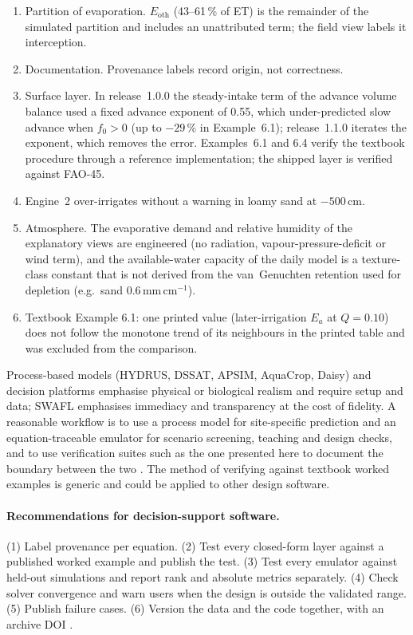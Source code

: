 \documentclass[preprint,12pt]{elsarticle}
\begin{document}
\begin{enumerate}[nosep]
\item Partition of evaporation. $E_{\mathrm{oth}}$ (43--61\,\% of ET) is the remainder of the simulated partition and includes an unattributed term; the field view labels it interception.
\item Documentation. Provenance labels record origin, not correctness.
\item Surface layer. In release~1.0.0 the steady-intake term of the advance volume balance used a fixed advance exponent of 0.55, which under-predicted slow advance when $f_0>0$ (up to $-29$\,\% in Example~6.1); release~1.1.0 iterates the exponent, which removes the error. Examples~6.1 and 6.4 verify the textbook procedure through a reference implementation; the shipped layer is verified against FAO-45.
\item Engine~2 over-irrigates without a warning in loamy sand at $-500$\,cm.
\item Atmosphere. The evaporative demand and relative humidity of the explanatory views are engineered (no radiation, vapour-pressure-deficit or wind term), and the available-water capacity of the daily model is a texture-class constant that is not derived from the van~Genuchten retention used for depletion (e.g.\ sand 0.6\,mm\,cm$^{-1}$).
\item Textbook Example 6.1: one printed value (later-irrigation $E_a$ at $Q=0.10$) does not follow the monotone trend of its neighbours in the printed table and was excluded from the comparison.
\end{enumerate}

Process-based models (HYDRUS, DSSAT, APSIM, AquaCrop, Daisy) and decision platforms emphasise physical or biological realism and require setup and data; SWAFL emphasises immediacy and transparency at the cost of fidelity. A reasonable workflow is to use a process model for site-specific prediction and an equation-traceable emulator for scenario screening, teaching and design checks, and to use verification suites such as the one presented here to document the boundary between the two \cite{Razavi2012,Asher2015}. The method of verifying against textbook worked examples is generic and could be applied to other design software.

\paragraph{Recommendations for decision-support software.} (1) Label provenance per equation. (2) Test every closed-form layer against a published worked example and publish the test. (3) Test every emulator against held-out simulations and report rank and absolute metrics separately. (4) Check solver convergence and warn users when the design is outside the validated range. (5) Publish failure cases. (6) Version the data and the code together, with an archive DOI \cite{Wilkinson2016}.
\end{document}
